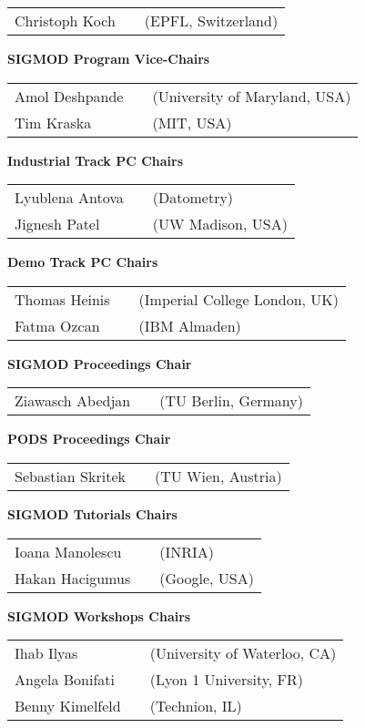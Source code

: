 {\begin{tabular}{lp{.5em}l}
Christoph Koch	&& \textsf{\footnotesize(EPFL, Switzerland)}
\end{tabular}

\vfill
\textbf{SIGMOD Program Vice-Chairs}

\begin{tabular}{lp{.5em}l}
Amol Deshpande	&& \textsf{\footnotesize(University of Maryland, USA)}	\\
Tim Kraska	&& \textsf{\footnotesize(MIT, USA)}
\end{tabular}

\vfill
\textbf{Industrial Track PC Chairs}

\begin{tabular}{lp{.5em}l}
Lyublena Antova	&& \textsf{\footnotesize(Datometry)}	\\
Jignesh Patel	&& \textsf{\footnotesize(UW Madison, USA)}
\end{tabular}

\vfill
\textbf{Demo Track PC Chairs}

\begin{tabular}{lp{.5em}l}
Thomas Heinis	&& \textsf{\footnotesize(Imperial College London, UK)}	\\
Fatma Ozcan	&& \textsf{\footnotesize(IBM Almaden)}
\end{tabular}

\vfill
\textbf{SIGMOD Proceedings Chair}

\begin{tabular}{lp{.5em}l}
Ziawasch Abedjan	&& \textsf{\footnotesize(TU Berlin, Germany)}
\end{tabular}

\vfill
\textbf{PODS Proceedings Chair}

\begin{tabular}{lp{.5em}l}
Sebastian Skritek	&& \textsf{\footnotesize(TU Wien, Austria)}
\end{tabular}

\vfill
\textbf{SIGMOD Tutorials Chairs}

\begin{tabular}{lp{.5em}l}
Ioana Manolescu	&& \textsf{\footnotesize(INRIA)}	\\
Hakan Hacigumus	&& \textsf{\footnotesize(Google, USA)}
\end{tabular}

\vfill
\textbf{SIGMOD Workshops Chairs}

\begin{tabular}{lp{.5em}l}
Ihab Ilyas	&& \textsf{\footnotesize(University of Waterloo, CA)}	\\
Angela Bonifati	&& \textsf{\footnotesize(Lyon 1 University, FR)}	\\
Benny Kimelfeld	&& \textsf{\footnotesize(Technion, IL)}
\end{tabular}

}
